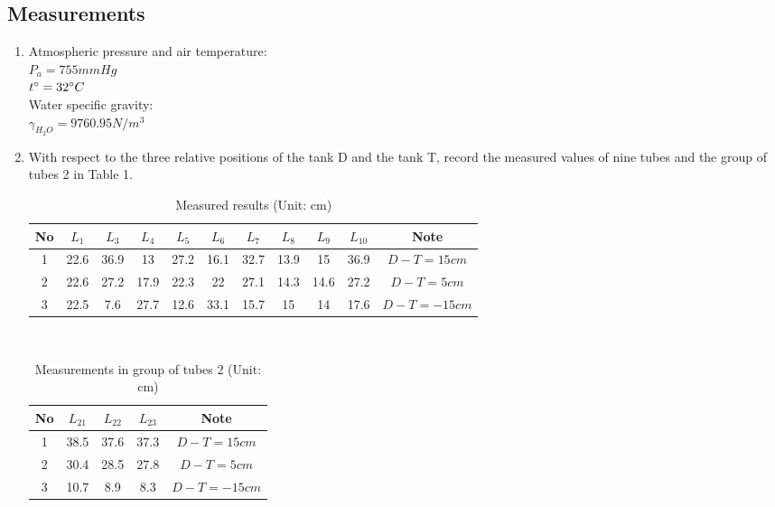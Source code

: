 \subsection{Measurements}
\begin{enumerate}
	\item Atmospheric pressure and air temperature:\\
	$P_a=755 mmHg$\\ $t\degree = 32 \degree C$\\
	Water specific gravity:\\
	$\gamma_{H_2O}=9760.95 N/m^3$
	\item With respect to the three relative positions of the tank D and the tank T, record the measured values of nine tubes and the group of tubes 2 in Table 1. \\
	\begin{table}[ht]
		\centering
		\begin{tabular}{|c|c|c|c|c|c|c|c|c|c|c|}
			\hline
			No & $L_1$ & $L_3$ & $L_4$ & $L_5$ & $L_6$ & $L_7$ & $L_8$ & $L_9$ & $L_{10}$ & Note\\ \hline
			1 & 22.6 & 36.9 & 13 & 27.2 & 16.1 & 32.7 & 13.9 & 15 & 36.9 & $D-T=15cm$ \\ \hline
			2 & 22.6 & 27.2 & 17.9 & 22.3 & 22 & 27.1 & 14.3 & 14.6 & 27.2 & $D-T=5cm$ \\ \hline
			3 & 22.5 & 7.6 & 27.7 & 12.6 & 33.1 & 15.7 & 15 & 14 & 17.6 & $D-T=-15cm$ \\ \hline
		\end{tabular}
		\caption{Measured results (Unit: cm)}
		\label{tab1lab1}
	\end{table}\\
	\begin{table}[ht]
		\centering
		\begin{tabular}{|c|c|c|c|c|}
			\hline
			No & $L_{21}$ & $L_{22}$ & $L_{23}$ & Note \\ \hline
			1 & 38.5 & 37.6 & 37.3 & $D-T=15cm$ \\ \hline
			2 & 30.4 & 28.5 & 27.8 & $D-T=5cm$ \\ \hline
			3 & 10.7 & 8.9 & 8.3 & $D-T=-15cm$ \\ \hline
		\end{tabular}
		\caption{Measurements in group of tubes 2 (Unit: cm)}
		\label{tab2lab1}
	\end{table}
\end{enumerate}

